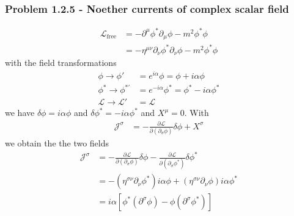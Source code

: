 \documentclass[10pt,a4paper]{book}
\theoremstyle{definition}
\begin{document}
\subsubsection*{Problem 1.2.5 - Noether currents of complex scalar field}
\begin{align}
    \mathcal{L}_\text{free}&=-\partial^\mu\phi^*\partial_\mu\phi-m^2\phi^*\phi\\
    &=-\eta^{\mu\nu}\partial_\nu\phi^*\partial_\nu\phi-m^2\phi^*\phi
\end{align}
with the field transformations
\begin{align}
    \phi\rightarrow\phi'&=e^{i\alpha}\phi=\phi+i\alpha\phi\\
    \phi^*\rightarrow\phi^{*'}&=e^{-i\alpha}\phi^*=\phi^*-i\alpha\phi^*\\
    \mathcal{L}\rightarrow\mathcal{L}'&=\mathcal{L}
\end{align}
we have $\delta\phi=i\alpha\phi$ and $\delta\phi^*=-i\alpha\phi^*$ and $X^\mu=0$. With 
\begin{align}
    \mathcal{J}^\sigma&=-\frac{\partial\mathcal{L}}{\partial(\partial_\sigma\phi)}\delta\phi+X^\sigma
\end{align}
we obtain the the two fields
\begin{align}    
    \mathcal{J}^\sigma&=-\frac{\partial\mathcal{L}}{\partial(\partial_\sigma\phi)}\delta\phi-\frac{\partial\mathcal{L}}{\partial(\partial_\sigma\phi^*)}\delta\phi^*\\
    &=-(\eta^{\sigma\nu}\partial_\nu\phi^*)i\alpha\phi+(\eta^{\sigma\nu}\partial_\nu\phi)i\alpha\phi^*\\
    &=i\alpha\left[\phi^*(\partial^\sigma\phi)-\phi(\partial^\sigma\phi^*)\right]
\end{align}
\end{document}
